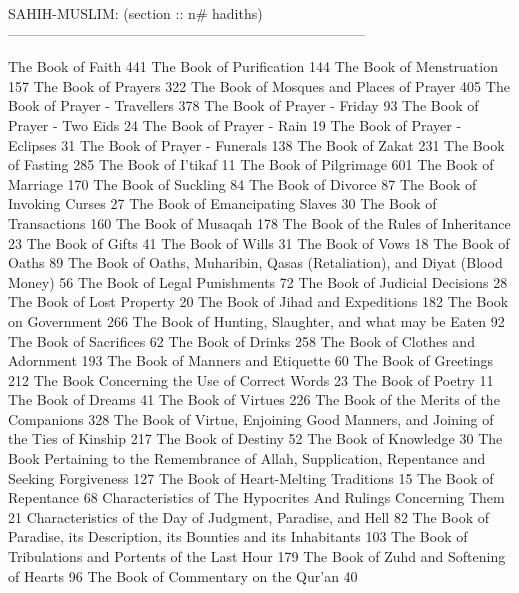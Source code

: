 SAHIH-MUSLIM:                                         (section :: n# hadiths)
-----------------------------------------------------------------------------

The Book of Faith	441
The Book of Purification	144
The Book of Menstruation	157
The Book of Prayers	322
The Book of Mosques and Places of Prayer	405
The Book of Prayer - Travellers	378
The Book of Prayer - Friday	93
The Book of Prayer - Two Eids	24
The Book of Prayer - Rain	19
The Book of Prayer - Eclipses	31
The Book of Prayer - Funerals	138
The Book of Zakat	231
The Book of Fasting	285
The Book of I'tikaf	11
The Book of Pilgrimage	601
The Book of Marriage	170
The Book of Suckling	84
The Book of Divorce	87
The Book of Invoking Curses	27
The Book of Emancipating Slaves	30
The Book of Transactions	160
The Book of Musaqah	178
The Book of the Rules of Inheritance	23
The Book of Gifts	41
The Book of Wills	31
The Book of Vows	18
The Book of Oaths	89
The Book of Oaths, Muharibin, Qasas (Retaliation), and Diyat (Blood Money)	56
The Book of Legal Punishments	72
The Book of Judicial Decisions	28
The Book of Lost Property	20
The Book of Jihad and Expeditions	182
The Book on Government	266
The Book of Hunting, Slaughter, and what may be Eaten	92
The Book of Sacrifices	62
The Book of Drinks	258
The Book of Clothes and Adornment	193
The Book of Manners and Etiquette	60
The Book of Greetings	212
The Book Concerning the Use of Correct Words	23
The Book of Poetry	11
The Book of Dreams	41
The Book of Virtues	226
The Book of the Merits of the Companions	328
The Book of Virtue, Enjoining Good Manners, and Joining of the Ties of Kinship	217
The Book of Destiny	52
The Book of Knowledge	30
The Book Pertaining to the Remembrance of Allah, Supplication, Repentance and Seeking Forgiveness	127
The Book of Heart-Melting Traditions	15
The Book of Repentance	68
Characteristics of The Hypocrites And Rulings Concerning Them	21
Characteristics of the Day of Judgment, Paradise, and Hell	82
The Book of Paradise, its Description, its Bounties and its Inhabitants	103
The Book of Tribulations and Portents of the Last Hour	179
The Book of Zuhd and Softening of Hearts	96
The Book of Commentary on the Qur'an	40

